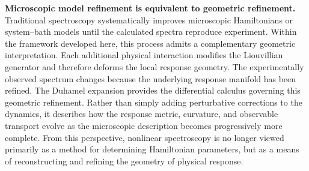 \begin{tcolorbox}[
colback=gray!5,
colframe=black,
title=\textbf{Principle of Geometric Refinement},
fonttitle=\bfseries,
breakable]
\textbf{Microscopic model refinement is equivalent to geometric refinement.}
Traditional spectroscopy systematically improves microscopic
Hamiltonians or system--bath models until the calculated spectra
reproduce experiment. Within the framework developed here, this
process admits a complementary geometric interpretation. Each
additional physical interaction modifies the Liouvillian
generator and therefore deforms the local response geometry.
The experimentally observed spectrum changes because the
underlying response manifold has been refined.
The Duhamel expansion provides the differential calculus
governing this geometric refinement. Rather than simply adding
perturbative corrections to the dynamics, it describes how the
response metric, curvature, and observable transport evolve as
the microscopic description becomes progressively more complete.
From this perspective, nonlinear spectroscopy is no longer
viewed primarily as a method for determining Hamiltonian
parameters, but as a means of reconstructing and refining the
geometry of physical response.
\end{tcolorbox}